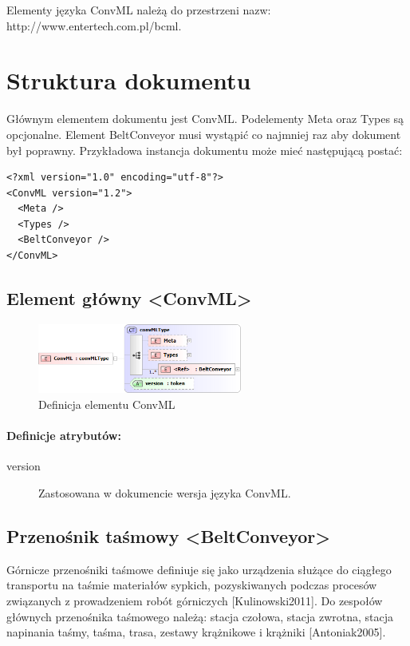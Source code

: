 \documentclass[12pt,a4paper]{article}
\begin{document}
Elementy języka ConvML należą do przestrzeni nazw:
http://www.entertech.com.pl/bcml.


\section{Struktura dokumentu}
Głównym elementem dokumentu jest ConvML.  Podelementy Meta oraz Types są
opcjonalne. Element BeltConveyor musi wystąpić co najmniej raz aby dokument był
poprawny.  Przykładowa instancja dokumentu może mieć następującą postać:

\begin{verbatim}
<?xml version="1.0" encoding="utf-8"?>
<ConvML version="1.2">
  <Meta />
  <Types />
  <BeltConveyor />
</ConvML>
\end{verbatim}  


\subsection{Element główny <ConvML>}

\begin{figure}[h]
  \centering
  \includegraphics[width=0.6\textwidth]{png/convml_xsd2}
  \caption{Definicja elementu ConvML}
  \label{fig:convml-xsd}
\end{figure}

\paragraph{Definicje atrybutów:}
\begin{description}
\item[version] Zastosowana w dokumencie wersja języka ConvML.
\end{description}


\subsection{Przenośnik taśmowy <BeltConveyor>}
Górnicze przenośniki taśmowe definiuje się jako urządzenia służące do ciągłego
transportu na taśmie materiałów sypkich, pozyskiwanych podczas procesów
związanych z prowadzeniem robót górniczych [Kulinowski2011].  Do zespołów
głównych przenośnika taśmowego należą: stacja czołowa, stacja zwrotna, stacja
napinania taśmy, taśma, trasa, zestawy krążnikowe i krążniki [Antoniak2005].
\end{document}
